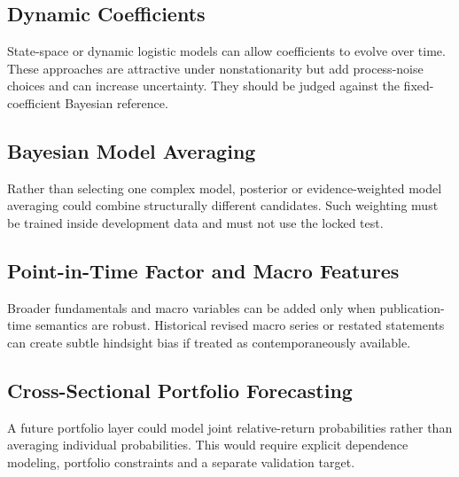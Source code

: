 \documentclass[11pt]{article}
\begin{document}
\subsection{Dynamic Coefficients}
State-space or dynamic logistic models can allow coefficients to evolve over time. These approaches are attractive under nonstationarity but add process-noise choices and can increase uncertainty. They should be judged against the fixed-coefficient Bayesian reference.

\subsection{Bayesian Model Averaging}
Rather than selecting one complex model, posterior or evidence-weighted model averaging could combine structurally different candidates. Such weighting must be trained inside development data and must not use the locked test.

\subsection{Point-in-Time Factor and Macro Features}
Broader fundamentals and macro variables can be added only when publication-time semantics are robust. Historical revised macro series or restated statements can create subtle hindsight bias if treated as contemporaneously available.

\subsection{Cross-Sectional Portfolio Forecasting}
A future portfolio layer could model joint relative-return probabilities rather than averaging individual probabilities. This would require explicit dependence modeling, portfolio constraints and a separate validation target.



\end{document}
